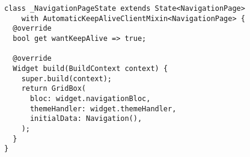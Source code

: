   \begin{lstlisting}
class _NavigationPageState extends State<NavigationPage>
    with AutomaticKeepAliveClientMixin<NavigationPage> {
  @override
  bool get wantKeepAlive => true;

  @override
  Widget build(BuildContext context) {
    super.build(context);
    return GridBox(
      bloc: widget.navigationBloc,
      themeHandler: widget.themeHandler,
      initialData: Navigation(),
    );
  }
}
  \end{lstlisting}
  
  
